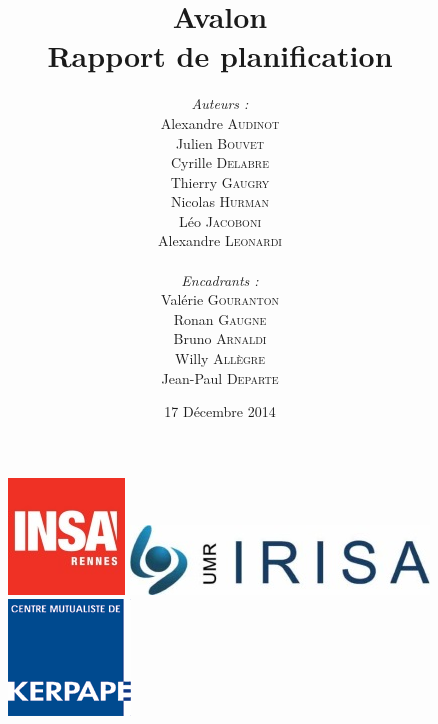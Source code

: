 \documentclass[a4paper,11pt]{article}
\title{
  \textbf{Avalon}\\
  Rapport de planification
}
\author{
\begin{minipage}{0.4\textwidth}
	\begin{flushleft} \large
		\emph{Auteurs :}\\
		Alexandre \textsc{Audinot}\\
		Julien \textsc{Bouvet}\\
		Cyrille \textsc{Delabre}\\
		Thierry \textsc{Gaugry}\\
		Nicolas \textsc{Hurman}\\
		Léo \textsc{Jacoboni}\\
		Alexandre \textsc{Leonardi}\\
	\end{flushleft}
\end{minipage}
\begin{minipage}{0.4\textwidth}
	\begin{flushright} \large
		\emph{Encadrants :} \\
		Valérie \textsc{Gouranton}\\
		Ronan \textsc{Gaugne}\\
		Bruno \textsc{Arnaldi}\\
		Willy \textsc{Allègre}\\
		Jean-Paul  \textsc{Departe}\\
	\end{flushright}
\end{minipage}
}
\date{17 Décembre 2014}
\begin{document}
\maketitle
\thispagestyle{empty}

\begin{figure}[h!]
   \begin{minipage}{0.3\linewidth}
      \includegraphics[scale=0.9]{3-Planification/img/logo_insa.jpeg}
   \end{minipage} 
   \begin{minipage}{0.2\linewidth}
      \centering
      \includegraphics[scale=0.5,left]{3-Planification/img/logo_irisa.jpg}
   \end{minipage}\hfill
   \begin{minipage}{0.2\linewidth}
      \includegraphics[scale=0.9]{3-Planification/img/logo_kerpape.png}
   \end{minipage}
\end{figure}

\pagebreak
\newpage
\strut
\newpage
\tableofcontents
\pagebreak


\pagebreak

\pagebreak

\pagebreak

\pagebreak

\pagebreak

\end{document}
